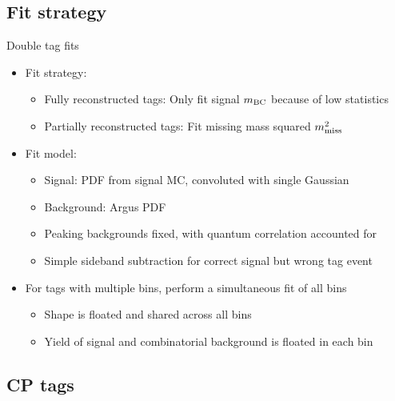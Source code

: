 \documentclass{beamer}
\begin{document}
\subsection{Fit strategy}

\begin{frame}{Double tag fits}
  \begin{itemize}
    \setlength\itemsep{1.0em}
    \item{Fit strategy:}
    \begin{itemize}
      \item{Fully reconstructed tags: Only fit signal $m_{\rm BC}$ because of low statistics}
      \item{Partially reconstructed tags: Fit missing mass squared $m^2_{\rm miss}$}
    \end{itemize}
    \item{Fit model:}
    \begin{itemize}
      \item{Signal: PDF from signal MC, convoluted with single Gaussian}
      \item{Background: Argus PDF}
      \item{Peaking backgrounds fixed, with quantum correlation accounted for}
      \item{Simple sideband subtraction for correct signal but wrong tag event}
    \end{itemize}
    \item{For tags with multiple bins, perform a simultaneous fit of all bins}
    \begin{itemize}
      \item{Shape is floated and shared across all bins}
      \item{Yield of signal and combinatorial background is floated in each bin}
    \end{itemize}
  \end{itemize}
\end{frame}

\subsection{CP tags}
\end{document}
